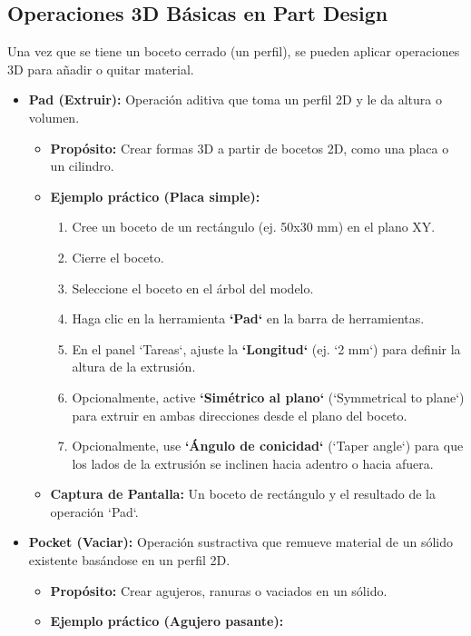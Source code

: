 \documentclass[12pt]{article}
\begin{document}
\subsection{Operaciones 3D Básicas en Part Design}
Una vez que se tiene un boceto cerrado (un perfil), se pueden aplicar operaciones 3D para añadir o quitar material.
\begin{itemize}[label=\textbullet]
    \item \textbf{Pad (Extruir):} Operación aditiva que toma un perfil 2D y le da altura o volumen.
    \begin{itemize}[label=\textendash]
        \item \textbf{Propósito:} Crear formas 3D a partir de bocetos 2D, como una placa o un cilindro.
        \item \textbf{Ejemplo práctico (Placa simple):}
        \begin{enumerate}[label=\arabic*)]
            \item Cree un boceto de un rectángulo (ej. 50x30 mm) en el plano XY.
            \item Cierre el boceto.
            \item Seleccione el boceto en el árbol del modelo.
            \item Haga clic en la herramienta \textbf{`Pad`} en la barra de herramientas.
            \item En el panel `Tareas`, ajuste la \textbf{`Longitud`} (ej. `2 mm`) para definir la altura de la extrusión.
            \item Opcionalmente, active \textbf{`Simétrico al plano`} (`Symmetrical to plane`) para extruir en ambas direcciones desde el plano del boceto.
            \item Opcionalmente, use \textbf{`Ángulo de conicidad`} (`Taper angle`) para que los lados de la extrusión se inclinen hacia adentro o hacia afuera.
        \end{enumerate}
        \item \textbf{Captura de Pantalla:} Un boceto de rectángulo y el resultado de la operación `Pad`.
    \end{itemize}
    \item \textbf{Pocket (Vaciar):} Operación sustractiva que remueve material de un sólido existente basándose en un perfil 2D.
    \begin{itemize}[label=\textendash]
        \item \textbf{Propósito:} Crear agujeros, ranuras o vaciados en un sólido.
        \item \textbf{Ejemplo práctico (Agujero pasante):}

\end{itemize}
\end{itemize}
\end{document}
